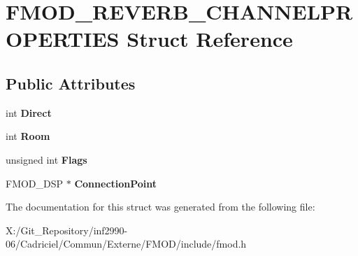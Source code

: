 \hypertarget{struct_f_m_o_d___r_e_v_e_r_b___c_h_a_n_n_e_l_p_r_o_p_e_r_t_i_e_s}{\section{F\-M\-O\-D\-\_\-\-R\-E\-V\-E\-R\-B\-\_\-\-C\-H\-A\-N\-N\-E\-L\-P\-R\-O\-P\-E\-R\-T\-I\-E\-S Struct Reference}
\label{struct_f_m_o_d___r_e_v_e_r_b___c_h_a_n_n_e_l_p_r_o_p_e_r_t_i_e_s}
}
\subsection*{Public Attributes}
\begin{DoxyCompactItemize}
\item 
\hypertarget{struct_f_m_o_d___r_e_v_e_r_b___c_h_a_n_n_e_l_p_r_o_p_e_r_t_i_e_s_a4b8d70f2215d3170ef4d2d06db7a41bf}{int {\bfseries Direct}}\label{struct_f_m_o_d___r_e_v_e_r_b___c_h_a_n_n_e_l_p_r_o_p_e_r_t_i_e_s_a4b8d70f2215d3170ef4d2d06db7a41bf}

\item 
\hypertarget{struct_f_m_o_d___r_e_v_e_r_b___c_h_a_n_n_e_l_p_r_o_p_e_r_t_i_e_s_a4c5a73c7a00690a7e25d3b4ab50c6cc6}{int {\bfseries Room}}\label{struct_f_m_o_d___r_e_v_e_r_b___c_h_a_n_n_e_l_p_r_o_p_e_r_t_i_e_s_a4c5a73c7a00690a7e25d3b4ab50c6cc6}

\item 
\hypertarget{struct_f_m_o_d___r_e_v_e_r_b___c_h_a_n_n_e_l_p_r_o_p_e_r_t_i_e_s_ac1b89e86a536121fc1c1d0602f7346d7}{unsigned int {\bfseries Flags}}\label{struct_f_m_o_d___r_e_v_e_r_b___c_h_a_n_n_e_l_p_r_o_p_e_r_t_i_e_s_ac1b89e86a536121fc1c1d0602f7346d7}

\item 
\hypertarget{struct_f_m_o_d___r_e_v_e_r_b___c_h_a_n_n_e_l_p_r_o_p_e_r_t_i_e_s_afa124f21c3035badddc2dabc008ec0c5}{F\-M\-O\-D\-\_\-\-D\-S\-P $\ast$ {\bfseries Connection\-Point}}\label{struct_f_m_o_d___r_e_v_e_r_b___c_h_a_n_n_e_l_p_r_o_p_e_r_t_i_e_s_afa124f21c3035badddc2dabc008ec0c5}

\end{DoxyCompactItemize}


The documentation for this struct was generated from the following file\-:\begin{DoxyCompactItemize}
\item 
X\-:/\-Git\-\_\-\-Repository/inf2990-\/06/\-Cadriciel/\-Commun/\-Externe/\-F\-M\-O\-D/include/fmod.\-h\end{DoxyCompactItemize}
